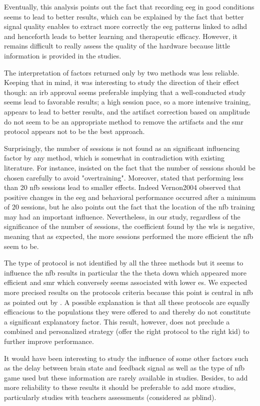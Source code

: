 Eventually, this analysis points out the fact that recording \gls{eeg} in good conditions seems to lead to better results, 
which can be explained by the fact that better signal quality enables to extract more correctly the \gls{eeg} 
patterns linked to \gls{adhd} and henceforth leads to better learning and therapeutic efficacy. However, it remains difficult to 
really assess the quality of the hardware because little information is provided in the studies.  

The interpretation of factors returned only by two methods was less reliable. Keeping that in mind, it was interesting 
to study the direction of their effect though: an \gls{irb} approval seems preferable implying that a well-conducted study 
seems lead to favorable results; a high session pace, so a more intensive training, appears to lead to better results,
and the artifact correction based on amplitude do not seem to be an appropriate method to remove the artifacts and the \gls{smr} protocol
appears not to be the best approach. 

Surprisingly, the number of sessions is not found as an significant influencing factor by any method, 
which is somewhat in contradiction with existing literature.
For instance, \citet{Enriquez2017} insisted on the fact that the number of sessions should be 
chosen carefully to avoid "overtraining". Moreover, \citet{Arns2014} stated that performing less than 20 \gls{nfb} sessions 
lead to smaller effects. Indeed {Vernon2004} observed that positive changes in the \gls{eeg} and behavioral 
performance occurred after a minimum of 20 sessions, but he also points out the fact that the
location of the \gls{nfb} training may had an important influence. 
Nevertheless, in our study, regardless of the significance of the number of sessions, the coefficient 
found by the \gls{wls} is negative, meaning that as expected,
the more sessions performed the more efficient the \gls{nfb} seem to be. 

The type of protocol is not identified by all the three methods but it seems to influence the \gls{nfb} results in particular the the theta down 
which appeared more efficient and \gls{smr} which conversely seems associated with lower \gls{es}. We expected 
more precised results on the protocols criteria because this point is central in \gls{nfb} as pointed out by \citet{Vernon2004}.
A possible explanation is that all these protocols are equally efficacious to the populations they were offered to and 
thereby do not constitute a significant explanatory factor. This result, however,
does not preclude a combined and personalized strategy (offer the right protocol to the right kid) to 
further improve performance. 

It would have been interesting to study the influence of some other factors such as the delay between brain state and feedback signal as well as the type of \gls{nfb} game used 
but these information are rarely available in studies. Besides, to add more reliability to these results it should be preferable to add more studies, 
particularly studies with teachers assessments (considered as \gls{pblind}). 

